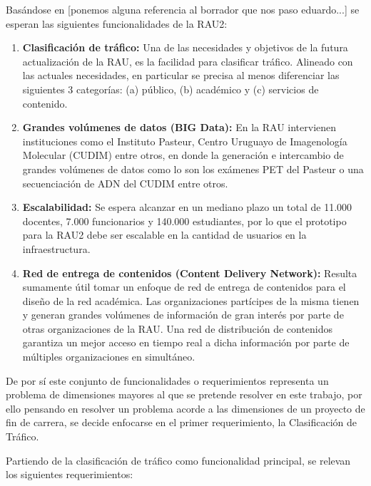 Basándose en [ponemos alguna referencia al borrador que nos paso eduardo...] se esperan las siguientes funcionalidades de la RAU2:

\begin{enumerate}
\item \textbf{Clasificación de tráfico:} Una de las necesidades y objetivos de la futura actualizaci\'on de la RAU, es la facilidad para clasificar tráfico. Alineado con las actuales necesidades, en particular se precisa al menos diferenciar las siguientes 3 categorías: (a) público, (b) académico y (c) servicios de contenido.

\item \textbf{Grandes volúmenes de datos (BIG Data):} En la RAU intervienen instituciones como el Instituto Pasteur, Centro Uruguayo de Imagenología Molecular (CUDIM) entre otros, en donde la generación e intercambio de grandes volúmenes de datos como lo son los exámenes PET del Pasteur o una secuenciación de ADN del CUDIM entre otros.

\item \textbf{Escalabilidad:} Se espera alcanzar en un mediano plazo un total de 11.000 docentes, 7.000 funcionarios y 140.000 estudiantes, por lo que el prototipo para la RAU2 debe ser escalable en la cantidad de usuarios en la infraestructura.

\item \textbf{Red de entrega de contenidos (Content Delivery Network):} Resulta sumamente útil tomar un enfoque de red de entrega de contenidos para el diseño de la red académica. Las organizaciones partícipes de la misma tienen y generan grandes volúmenes de información de gran interés por parte de otras organizaciones de la RAU. Una red de distribución de contenidos garantiza un mejor acceso en tiempo real a dicha información por parte de múltiples organizaciones en simultáneo. 
 
\end{enumerate}

De por s\'i este conjunto de funcionalidades o requerimientos representa un problema de dimensiones mayores al que se pretende resolver en este trabajo, por ello pensando en resolver un problema acorde a las dimensiones de un proyecto de fin de carrera, se decide enfocarse en el primer requerimiento, la Clasificación de Tr\'afico.

Partiendo de la clasificación de tr\'afico como funcionalidad principal, se relevan los siguientes requerimientos:

